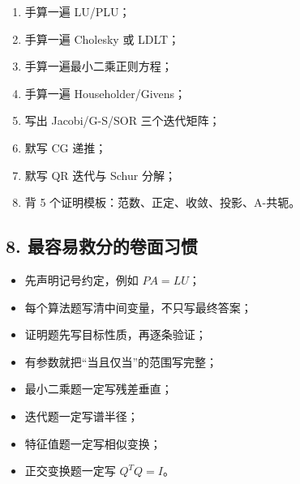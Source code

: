 \documentclass[11pt,a4paper]{ctexart}
\begin{document}
\begin{enumerate}

\item 手算一遍 LU/PLU；

\item 手算一遍 Cholesky 或 LDLT；

\item 手算一遍最小二乘正则方程；

\item 手算一遍 Householder/Givens；

\item 写出 Jacobi/G-S/SOR 三个迭代矩阵；

\item 默写 CG 递推；

\item 默写 QR 迭代与 Schur 分解；

\item 背 5 个证明模板：范数、正定、收敛、投影、A-共轭。

\end{enumerate}


\subsection*{8. 最容易救分的卷面习惯}


\begin{itemize}

\item 先声明记号约定，例如 $PA=LU$；

\item 每个算法题写清中间变量，不只写最终答案；

\item 证明题先写目标性质，再逐条验证；

\item 有参数就把“当且仅当”的范围写完整；

\item 最小二乘题一定写残差垂直；

\item 迭代题一定写谱半径；

\item 特征值题一定写相似变换；

\item 正交变换题一定写 $Q^TQ=I$。

\end{itemize}
\end{document}
